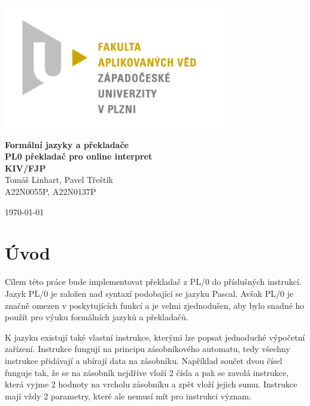 \documentclass[12pt, letterpaper]{article}
\begin{document}
\begin{titlepage}
\centerline{\includegraphics[width=10cm]{img/logo.jpg}}
\begin{center}
\vspace{30px}
{\huge
\textbf{Formální jazyky a překladače}\\
\textbf{PL0 překladač pro online interpret}\\
\vspace{1cm}
}
{\large
\textbf{KIV/FJP}\\
\vspace{1cm}
}
\vspace{1cm}
{\large
Tomáš Linhart, Pavel Třeštík\\
}
{\normalsize
A22N0055P, A22N0137P
}
\end{center}
\vspace{\fill}
\hfill
\begin{minipage}[t]{7cm}
\flushright
\today
\end{minipage}
\end{titlepage}
\section{Úvod}
Cílem této práce bude implementovat překladač z  PL/0 do příslušných instrukcí. Jazyk PL/0
je založen nad syntaxí podobající se jazyku Pascal. Avšak PL/0 je značně omezen v poskytujících funkcí a je velmi 
zjednodušen, aby bylo snadné ho použít pro výuku formálních jazyků a překladačů.

K jazyku existují také vlastní instrukce, kterými lze popsat jednoduché výpočetní zařízení. Instrukce fungují na 
principu zásobníkového automatu, tedy všechny instrukce přidávají a ubírají data na zásobníku. Například součet dvou
čísel funguje tak, že se na zásobník nejdříve vloží 2 čísla a pak se zavolá instrukce, která vyjme 2 hodnoty na vrcholu
zásobníku a zpět vloží jejich sumu. Instrukce mají vždy 2 parametry, které ale nemusí mít pro instrukci význam.
\end{document}
